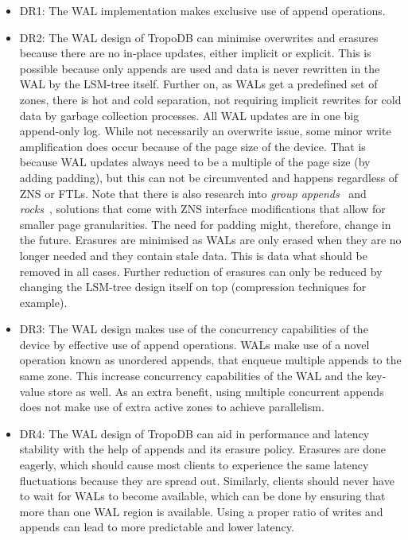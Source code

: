 \begin{itemize}
    \item DR1: The WAL implementation makes exclusive use of append operations.
    \item DR2: The WAL design of TropoDB can minimise overwrites and erasures because there are no in-place updates, either implicit or explicit. This is possible because only appends are used and data is never rewritten in the WAL by the LSM-tree itself. Further on, as WALs get a predefined set of zones, there is hot and cold separation, not requiring implicit rewrites for cold data by garbage collection processes. All WAL updates are in one big append-only log. While not necessarily an overwrite issue, some minor write amplification does occur because of the page size of the device. That is because WAL updates always need to be a multiple of the page size (by adding padding), but this can not be circumvented and happens regardless of ZNS or FTLs. Note that there is also research into \textit{group appends}~\cite{purandareappend} and \textit{rocks}~\cite{maheshwari2021blocks}, solutions that come with ZNS interface modifications that allow for smaller page granularities. The need for padding might, therefore, change in the future. Erasures are minimised as WALs are only erased when they are no longer needed and they contain stale data. This is data what should be removed in all cases. Further reduction of erasures can only be reduced by changing the LSM-tree design itself on top (compression techniques for example). 
    \item DR3: The WAL design makes use of the concurrency capabilities of the device by effective use of append operations. WALs make use of a novel operation known as unordered appends, that enqueue multiple appends to the same zone. This increase concurrency capabilities of the WAL and the key-value store as well. As an extra benefit, using multiple concurrent appends does not make use of extra active zones to achieve parallelism.
    \item DR4: The WAL design of TropoDB can aid in performance and latency stability with the help of appends and its erasure policy. Erasures are done eagerly, which should cause most clients to experience the same latency fluctuations because they are spread out. Similarly, clients should never have to wait for WALs to become available, which can be done by ensuring that more than one WAL region is available. Using a proper ratio of writes and appends can lead to more predictable and lower latency. 
\end{itemize}
